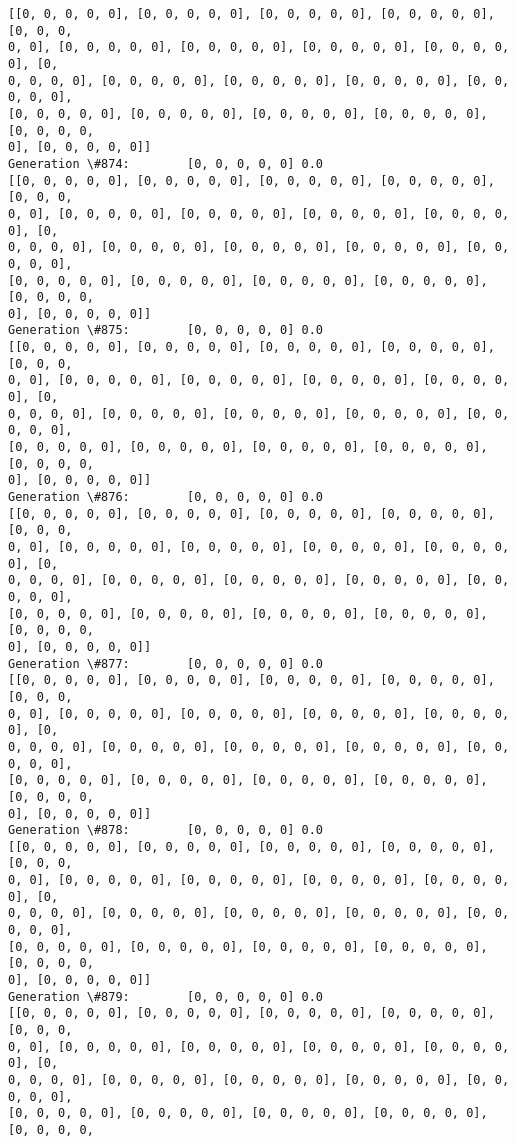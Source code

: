 \documentclass[11pt]{article}
\begin{document}
\begin{Verbatim}[commandchars=\\\{\}]
[[0, 0, 0, 0, 0], [0, 0, 0, 0, 0], [0, 0, 0, 0, 0], [0, 0, 0, 0, 0], [0, 0, 0,
0, 0], [0, 0, 0, 0, 0], [0, 0, 0, 0, 0], [0, 0, 0, 0, 0], [0, 0, 0, 0, 0], [0,
0, 0, 0, 0], [0, 0, 0, 0, 0], [0, 0, 0, 0, 0], [0, 0, 0, 0, 0], [0, 0, 0, 0, 0],
[0, 0, 0, 0, 0], [0, 0, 0, 0, 0], [0, 0, 0, 0, 0], [0, 0, 0, 0, 0], [0, 0, 0, 0,
0], [0, 0, 0, 0, 0]]
Generation \#874:        [0, 0, 0, 0, 0] 0.0
[[0, 0, 0, 0, 0], [0, 0, 0, 0, 0], [0, 0, 0, 0, 0], [0, 0, 0, 0, 0], [0, 0, 0,
0, 0], [0, 0, 0, 0, 0], [0, 0, 0, 0, 0], [0, 0, 0, 0, 0], [0, 0, 0, 0, 0], [0,
0, 0, 0, 0], [0, 0, 0, 0, 0], [0, 0, 0, 0, 0], [0, 0, 0, 0, 0], [0, 0, 0, 0, 0],
[0, 0, 0, 0, 0], [0, 0, 0, 0, 0], [0, 0, 0, 0, 0], [0, 0, 0, 0, 0], [0, 0, 0, 0,
0], [0, 0, 0, 0, 0]]
Generation \#875:        [0, 0, 0, 0, 0] 0.0
[[0, 0, 0, 0, 0], [0, 0, 0, 0, 0], [0, 0, 0, 0, 0], [0, 0, 0, 0, 0], [0, 0, 0,
0, 0], [0, 0, 0, 0, 0], [0, 0, 0, 0, 0], [0, 0, 0, 0, 0], [0, 0, 0, 0, 0], [0,
0, 0, 0, 0], [0, 0, 0, 0, 0], [0, 0, 0, 0, 0], [0, 0, 0, 0, 0], [0, 0, 0, 0, 0],
[0, 0, 0, 0, 0], [0, 0, 0, 0, 0], [0, 0, 0, 0, 0], [0, 0, 0, 0, 0], [0, 0, 0, 0,
0], [0, 0, 0, 0, 0]]
Generation \#876:        [0, 0, 0, 0, 0] 0.0
[[0, 0, 0, 0, 0], [0, 0, 0, 0, 0], [0, 0, 0, 0, 0], [0, 0, 0, 0, 0], [0, 0, 0,
0, 0], [0, 0, 0, 0, 0], [0, 0, 0, 0, 0], [0, 0, 0, 0, 0], [0, 0, 0, 0, 0], [0,
0, 0, 0, 0], [0, 0, 0, 0, 0], [0, 0, 0, 0, 0], [0, 0, 0, 0, 0], [0, 0, 0, 0, 0],
[0, 0, 0, 0, 0], [0, 0, 0, 0, 0], [0, 0, 0, 0, 0], [0, 0, 0, 0, 0], [0, 0, 0, 0,
0], [0, 0, 0, 0, 0]]
Generation \#877:        [0, 0, 0, 0, 0] 0.0
[[0, 0, 0, 0, 0], [0, 0, 0, 0, 0], [0, 0, 0, 0, 0], [0, 0, 0, 0, 0], [0, 0, 0,
0, 0], [0, 0, 0, 0, 0], [0, 0, 0, 0, 0], [0, 0, 0, 0, 0], [0, 0, 0, 0, 0], [0,
0, 0, 0, 0], [0, 0, 0, 0, 0], [0, 0, 0, 0, 0], [0, 0, 0, 0, 0], [0, 0, 0, 0, 0],
[0, 0, 0, 0, 0], [0, 0, 0, 0, 0], [0, 0, 0, 0, 0], [0, 0, 0, 0, 0], [0, 0, 0, 0,
0], [0, 0, 0, 0, 0]]
Generation \#878:        [0, 0, 0, 0, 0] 0.0
[[0, 0, 0, 0, 0], [0, 0, 0, 0, 0], [0, 0, 0, 0, 0], [0, 0, 0, 0, 0], [0, 0, 0,
0, 0], [0, 0, 0, 0, 0], [0, 0, 0, 0, 0], [0, 0, 0, 0, 0], [0, 0, 0, 0, 0], [0,
0, 0, 0, 0], [0, 0, 0, 0, 0], [0, 0, 0, 0, 0], [0, 0, 0, 0, 0], [0, 0, 0, 0, 0],
[0, 0, 0, 0, 0], [0, 0, 0, 0, 0], [0, 0, 0, 0, 0], [0, 0, 0, 0, 0], [0, 0, 0, 0,
0], [0, 0, 0, 0, 0]]
Generation \#879:        [0, 0, 0, 0, 0] 0.0
[[0, 0, 0, 0, 0], [0, 0, 0, 0, 0], [0, 0, 0, 0, 0], [0, 0, 0, 0, 0], [0, 0, 0,
0, 0], [0, 0, 0, 0, 0], [0, 0, 0, 0, 0], [0, 0, 0, 0, 0], [0, 0, 0, 0, 0], [0,
0, 0, 0, 0], [0, 0, 0, 0, 0], [0, 0, 0, 0, 0], [0, 0, 0, 0, 0], [0, 0, 0, 0, 0],
[0, 0, 0, 0, 0], [0, 0, 0, 0, 0], [0, 0, 0, 0, 0], [0, 0, 0, 0, 0], [0, 0, 0, 0,

\end{Verbatim}
\end{document}
